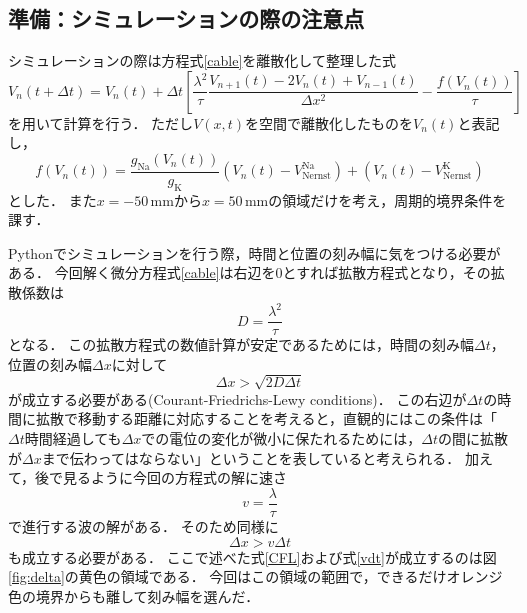 \documentclass[a4paper,11pt]{jsarticle}
\begin{document}
\subsection{準備：シミュレーションの際の注意点}
シミュレーションの際は方程式\eqref{cable}を離散化して整理した式
\begin{equation}
  V_n(t+\Delta t) = V_n(t) + {\Delta t}\left[\frac{\lambda^2}{\tau} \frac{V_{n+1}(t) - 2V_n(t) + V_{n-1}(t)}{\Delta x^2} - \frac{f(V_n(t))}{\tau} \right] 
\end{equation}
を用いて計算を行う．
ただし$V(x,t)$を空間で離散化したものを$V_n(t)$と表記し，
\begin{equation}
  f(V_n(t)) = \frac{g_{\mathrm{Na}}(V_n(t))}{g_\mathrm{K}}(V_n(t)-V^{\mathrm{Na}}_{\mathrm{Nernst}}) + (V_n(t)-V^{\mathrm{K}}_{\mathrm{Nernst}}) 
\end{equation}
とした．
また$x=-50$\,mmから$x=50$\,mmの領域だけを考え，周期的境界条件を課す．

Pythonでシミュレーションを行う際，時間と位置の刻み幅に気をつける必要がある．
今回解く微分方程式\eqref{cable}は右辺を0とすれば拡散方程式となり，その拡散係数は
\begin{equation}
  D = \frac{\lambda^2}{\tau}
\end{equation}
となる．
この拡散方程式の数値計算が安定であるためには，時間の刻み幅$\Delta t$，位置の刻み幅$\Delta x$に対して
\begin{equation}
  \Delta x > \sqrt{2D\Delta t} \label{CFL}
\end{equation}
が成立する必要がある(Courant-Friedrichs-Lewy conditions)．
この右辺が$\Delta t$の時間に拡散で移動する距離に対応することを考えると，直観的にはこの条件は「$\Delta t$時間経過しても$\Delta x$での電位の変化が微小に保たれるためには，$\Delta t$の間に拡散が$\Delta x$まで伝わってはならない」ということを表していると考えられる．
加えて，後で見るように今回の方程式の解に速さ
\begin{equation}
  v = \frac{\lambda}{\tau}
\end{equation}
で進行する波の解がある．
そのため同様に
\begin{equation}
  \Delta x > v\Delta t \label{vdt}
\end{equation}
も成立する必要がある．
ここで述べた式\eqref{CFL}および式\eqref{vdt}が成立するのは図\ref{fig:delta}の黄色の領域である．
今回はこの領域の範囲で，できるだけオレンジ色の境界からも離して刻み幅を選んだ．
\end{document}
